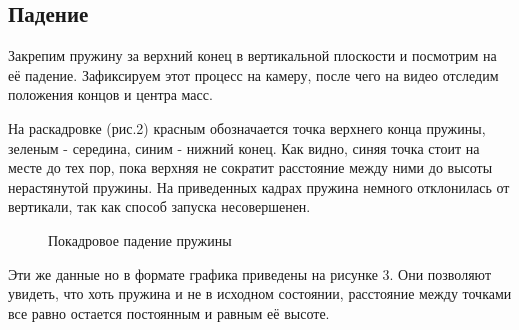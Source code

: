 \documentclass[a4paper,12pt]{report}
\begin{document}
\subsection*{Падение} \text{ }

Закрепим пружину за верхний конец в вертикальной плоскости и посмотрим на её падение. Зафиксируем этот процесс на камеру, после чего на видео отследим положения концов и центра масс.

На раскадровке (рис.2) красным обозначается точка верхнего конца пружины, зеленым - середина, синим - нижний конец. Как видно, синяя точка стоит на месте до тех пор, пока верхняя не сократит расстояние между ними до высоты нерастянутой пружины. На приведенных кадрах пружина немного отклонилась от вертикали, так как способ запуска несовершенен. 

\begin{figure}[H]
\caption{Покадровое падение пружины}
\end{figure}

Эти же данные но в формате графика приведены на рисунке 3. Они позволяют увидеть, что хоть пружина и не в исходном состоянии, расстояние между точками все равно остается постоянным и равным её высоте.
\end{document}
